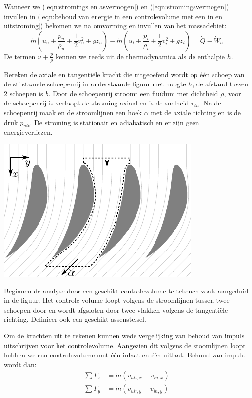 Wanneer we (\ref{eqn:stromings en asvermogen}) en (\ref{eqn:stromingsvermogen}) invullen in (\ref{eqn:behoud van energie in een controlevolume met een in en uitstroming}) bekomen we na omvorming en invullen van het massadebiet:
\begin{equation}
	\dot{m} (u_u + \frac{p_u}{\rho_u} + \frac{1}{2}v^2_u + g z_u) - \dot{m} (u_i + \frac{p_i}{\rho_i}+ \frac{1}{2}v^2_i + g z_i) = \dot{Q}-\dot{W}_a
	\label{eqn:behoud van energie in een controlevolume met een in en uitstroming asvermogen}
\end{equation}
De termen $u + \frac{p}{\rho}$ kennen we reeds uit de thermodynamica als de enthalpie $h$.

\begin{voorbeeld}
	Bereken de axiale en tangentiële kracht die uitgeoefend wordt op één schoep van de stilstaande schoepenrij in onderstaande figuur met hoogte $h$, de afstand tussen 2 schoepen is $b$. Door de schoepenrij stroomt een fluïdum met dichtheid $\rho$, voor de schoepenrij is verloopt de stroming axiaal en is de snelheid $v_{in}$. Na de schoepenrij maak en de stroomlijnen een hoek $\alpha$ met de axiale richting en is de druk $p_{uit}$. De stroming is stationair en adiabatisch en er zijn geen energieverliezen.
	\begin{center}
		\includegraphics{fig/controlevolumes/Schoepenrij}
	\end{center}

	Beginnen de analyse door een geschikt controlevolume te tekenen zoals aangeduid in de figuur. Het controle volume loopt volgens de stroomlijnen tussen twee schoepen door en wordt afgsloten door twee vlakken volgens de tangentiële richting. Definieer ook een geschikt assenstelsel.

	Om de krachten uit te rekenen kunnen wede vergelijking van behoud van impuls uitschrijven voor het controlevolume. Aangezien dit volgens de stoomlijnen loopt hebben we een controlevolume met één inlaat en één uitlaat. Behoud van impuls wordt dan:
	\begin{align*}
		\sum F_x &= \dot{m} \left(v_{uit,x} - v_{in,x}\right) \\
		\sum F_y &= \dot{m} \left(v_{uit,y} - v_{in,y}\right)
	\end{align*}


\end{voorbeeld}
